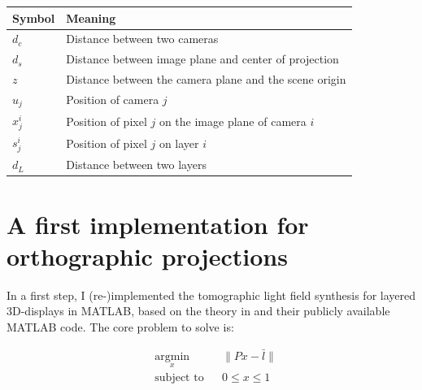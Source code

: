\documentclass[11pt,a4paper,titlepage]{article}
\begin{document}
\begin{center}
	\begin{tabular}{|l|l|}
	
		\hline
		Symbol 	& Meaning \\
		\hline 
		$d_c$ 	& Distance between two cameras \\ 
		\hline 
		$d_s$ 	& Distance between image plane and center of projection \\ 
		\hline 
		$z$ 	& Distance between the camera plane and the scene origin \\ 
		\hline
		$u_j$	& Position of camera $j$ \\
		\hline
		$x_j^i$ & Position of pixel $j$ on the image plane of camera $i$ \\
		\hline
		$s_j^i$ & Position of pixel $j$ on layer $i$ \\ 
		\hline 
		$d_L$ 	& Distance between two layers \\ 
		\hline 

	\end{tabular} 
\end{center}

\section{A first implementation for orthographic projections}	\label{sec:first_implementation}
In a first step, I (re-)implemented the tomographic light field synthesis for layered 3D-displays in MATLAB, based on the theory in \cite{WETZ_TOMO} and their publicly available MATLAB code. The core problem to solve is:

\begin{equation} \label{eq:core_problem}
	\begin{aligned}
		& \underset{x}{\text{argmin}} & & \| Px - \bar{l} \| \\
		& \text{subject to} & & 0 \leq x \leq 1
	\end{aligned}
\end{equation}
\end{document}

